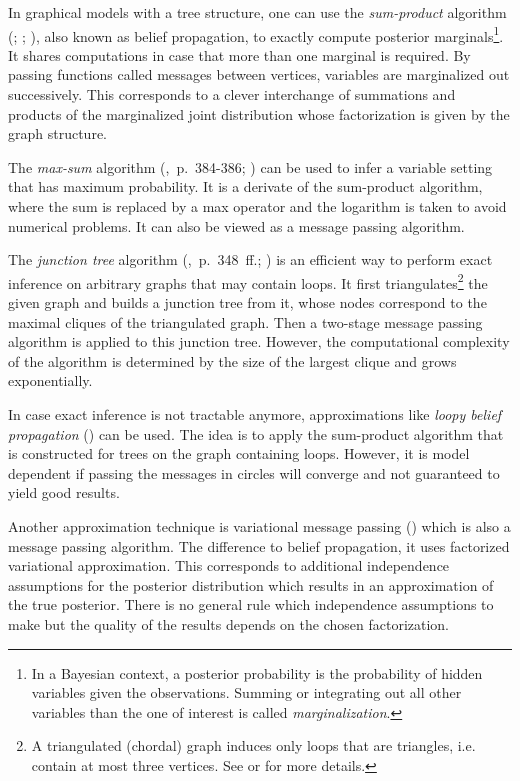 In graphical models with a tree structure, one can use the \emph{sum-product} algorithm (\cite{pearl1988probabilistic}; \cite{kim1983computational}; \cite{pearl1982reverend}), also known as belief propagation, to exactly compute posterior marginals\footnote{In a Bayesian context, a posterior probability is the probability of hidden variables given the observations. Summing or integrating out all other variables than the one of interest is called \emph{marginalization}.}. It shares computations in case that more than one marginal is required. By passing functions called messages between vertices, variables are marginalized out successively. This corresponds to a clever interchange of summations and products of the marginalized joint distribution whose factorization is given by the graph structure.

The \emph{max-sum} algorithm (\cite{bishop2006pattern},~p.~384-386; \cite{dawid1992applications}) can be used to infer a variable setting that has maximum probability. It is a derivate of the sum-product algorithm, where the sum is replaced by a max operator and the logarithm is taken to avoid numerical problems. It can also be viewed as a message passing algorithm.

The \emph{junction tree} algorithm (\cite{koller2009probabilistic},~p.~348~ff.; \cite{lauritzen1988local}) is an efficient way to perform exact inference on arbitrary graphs that may contain loops. It first triangulates\footnote{A triangulated (chordal) graph induces only loops that are triangles, i.e. contain at most three vertices.  See \textcite{fulkerson1965incidence} or \textcite{rose1976algorithmic} for more details.} the given graph and builds a junction tree from it, whose nodes correspond to the maximal cliques of the triangulated graph. Then a two-stage message passing algorithm is applied to this junction tree. However, the computational complexity of the algorithm is determined by the size of the largest clique and grows exponentially.

In case exact inference is not tractable anymore, approximations like \emph{loopy belief propagation} (\cite{frey1998revolution}) can be used. The idea is to apply the sum-product algorithm that is constructed for trees on the graph containing loops. However, it is model dependent if passing the messages in circles will converge and not guaranteed to yield good results.

Another approximation technique is variational message passing (\cite{winn2005variational}) which is also a message passing algorithm. The difference to belief propagation, it uses factorized variational approximation. This corresponds to additional independence assumptions for the posterior distribution which results in an approximation of the true posterior. There is no general rule which independence assumptions to make but the quality of the results depends on the chosen factorization.

